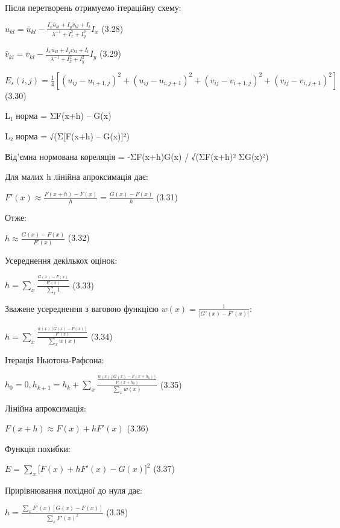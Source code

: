 \documentclass[
]{article}
\begin{document}
Після перетворень отримуємо ітераційну схему:

\({\widehat{u}}_{kl} = {\overline{u}}_{kl} - \frac{I_{x}{\overline{u}}_{kl} + I_{y}{\overline{v}}_{kl} + I_{t}}{\lambda^{- 1} + I_{x}^{2} + I_{y}^{2}}I_{x}\) (3.28)

\({\widehat{v}}_{kl} = {\overline{v}}_{kl} - \frac{I_{x}{\overline{u}}_{kl} + I_{y}{\overline{v}}_{kl} + I_{t}}{\lambda^{- 1} + I_{x}^{2} + I_{y}^{2}}I_{y}\) (3.29)

\(E_{s}(i,j) = \frac{1}{4}\left\lbrack {(u_{ij} - u_{i + 1,j})^{2} + (u_{ij} - u_{i,j + 1})^{2} + (v_{ij} - v_{i + 1,j})^{2} + (v_{ij} - v_{i,j + 1})^{2}} \right\rbrack\) (3.30)

L₁ норма = Σ\textbar F(x+h) -- G(x)\textbar{}

L₂ норма = √(Σ{[}F(x+h) -- G(x){]}²)

Від'ємна нормована кореляція = -ΣF(x+h)G(x) / √(ΣF(x+h)² ΣG(x)²)

Для малих h лінійна апроксимація дає:

\(F'(x) \approx \frac{F(x + h) - F(x)}{h} = \frac{G(x) - F(x)}{h}\) (3.31)

Отже:

\(h \approx \frac{G(x) - F(x)}{F'(x)}\) (3.32)

Усереднення декількох оцінок:

\(h = \sum_{x}^{}\frac{\frac{G(x) - F(x)}{F'(x)}}{\sum_{x}^{}1}\) (3.33)

Зважене усереднення з ваговою функцією \(w(x) = \frac{1}{\left| G'(x) - F'(x) \right|}\):

\(h = \sum_{x}^{}\frac{\frac{w(x)\left\lbrack G(x) - F(x) \right\rbrack}{F'(x)}}{\sum_{x}^{}{w(x)}}\) (3.34)

Ітерація Ньютона-Рафсона:

\(h_{0} = 0,h_{k + 1} = h_{k} + \sum_{x}^{}\frac{\frac{w(x)\left\lbrack G(x) - F\left( x + h_{k} \right) \right\rbrack}{F'\left( x + h_{k} \right)}}{\sum_{x}^{}{w(x)}}\) (3.35)

Лінійна апроксимація:

\(F(x + h) \approx F(x) + hF'(x)\) (3.36)

Функція похибки:

\(E = \sum_{x}^{}{\lbrack F(x) + hF'(x) - G(x)\rbrack^{2}}\) (3.37)

Прирівнювання похідної до нуля дає:

\(h = \frac{\sum_{x}^{}{F'(x)\left\lbrack G(x) - F(x) \right\rbrack}}{\sum_{x}^{}{F'(x)^{2}}}\) (3.38)
\end{document}
